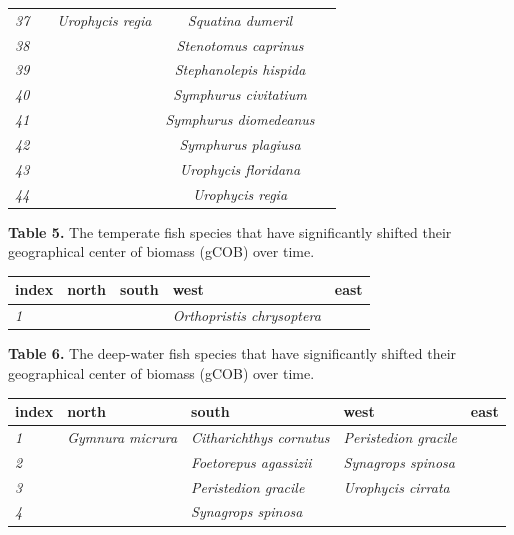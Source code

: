 \documentclass[
  letterpaper,
  DIV=11,
  numbers=noendperiod]{scrartcl}
\begin{document}
\begin{longtable*}[t]{ccccc}
\em{37} & \em{} & \em{Urophycis regia} & \em{Squatina dumeril} & \em{}\\
\em{38} & \em{} & \em{} & \em{Stenotomus caprinus} & \em{}\\
\em{39} & \em{} & \em{} & \em{Stephanolepis hispida} & \em{}\\
\em{40} & \em{} & \em{} & \em{Symphurus civitatium} & \em{}\\
\addlinespace
\em{41} & \em{} & \em{} & \em{Symphurus diomedeanus} & \em{}\\
\em{42} & \em{} & \em{} & \em{Symphurus plagiusa} & \em{}\\
\em{43} & \em{} & \em{} & \em{Urophycis floridana} & \em{}\\
\em{44} & \em{} & \em{} & \em{Urophycis regia} & \em{}\\
\bottomrule
\end{longtable*}

\textbf{Table 5.} The temperate fish species that have significantly
shifted their geographical center of biomass (gCOB) over time.

\begin{longtabu} to 
\toprule
index & north & south & west & east\\
\midrule
\em{1} & \em{} & \em{} & \em{Orthopristis chrysoptera} & \em{}\\
\bottomrule
\end{longtabu}

\textbf{Table 6.} The deep-water fish species that have significantly
shifted their geographical center of biomass (gCOB) over time.

\begin{longtabu} to 
\toprule
index & north & south & west & east\\
\midrule
\em{1} & \em{Gymnura micrura} & \em{Citharichthys cornutus} & \em{Peristedion gracile} & \em{}\\
\em{2} & \em{} & \em{Foetorepus agassizii} & \em{Synagrops spinosa} & \em{}\\
\em{3} & \em{} & \em{Peristedion gracile} & \em{Urophycis cirrata} & \em{}\\
\em{4} & \em{} & \em{Synagrops spinosa} & \em{} & \em{}\\
\bottomrule
\end{longtabu}
\end{document}
